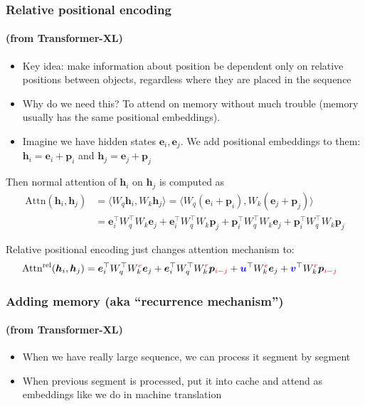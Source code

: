 \documentclass[10pt]{beamer}
\begin{document}
\begin{frame}
    \frametitle{Relative positional encoding}
    \framesubtitle{(from Transformer-XL)}
    \begin{itemize}
        \item\pause Key idea: make information about position be dependent only on relative positions between objects, regardless where they are placed in the sequence
        \item Why do we need this? \pause To attend on memory without much trouble (memory usually has the same positional embeddings).
        \item\pause Imagine we have hidden states $\bm e_i, \bm e_j$. We add positional embeddings to them: $\bm h_i = \bm e_i + \bm p_i$ and $\bm h_j = \bm e_j + \bm p_j$
    \end{itemize}
\pause Then normal attention of $\bm h_i$ on $\bm h_j$ is computed as
\begin{equation*}
\begin{split}
\text{Attn}(\bm h_i, \bm h_j)
&= \langle W_q \bm h_i, W_k \bm h_j \rangle = \langle W_q (\bm e_i + \bm p_i), W_k (\bm e_j + \bm p_j) \rangle \\
&= \bm e_i^\top W_q^\top W_k \bm e_j + \bm e_i^\top W_q^\top W_k \bm p_j + \bm p_i^\top W_q^\top W_k \bm e_j + \bm p_i^\top W_q^\top W_k \bm p_j
\end{split}
\end{equation*}

Relative positional encoding just changes attention mechanism to:
\begin{equation*}
\begin{split}
\text{Attn}^{\text{rel}}(\bm h_i, \bm h_j)
&= \bm e_i^\top W_q^\top W_k^{\textcolor{red}{e}} \bm e_j + \bm e_i^\top W_q^\top W_k^{\textcolor{red}{r}} \bm p_{\textcolor{red}{i-j}} + \textcolor{blue}{\bm u}^\top W_k^{\textcolor{red}{e}} \bm e_j + \textcolor{blue}{\bm v}^\top W_k^{\textcolor{red}{r}} \bm p_{\textcolor{red}{i-j}}
\end{split}
\end{equation*}

\end{frame}

\begin{frame}
    \frametitle{Adding memory (aka ``recurrence mechanism'')}
    \framesubtitle{(from Transformer-XL)}
    
    \begin{itemize}
        \item When we have really large sequence, we can process it segment by segment
        \item When previous segment is processed, put it into cache and attend as embeddings like we do in machine translation
    \end{itemize}
\end{frame}
\end{document}

